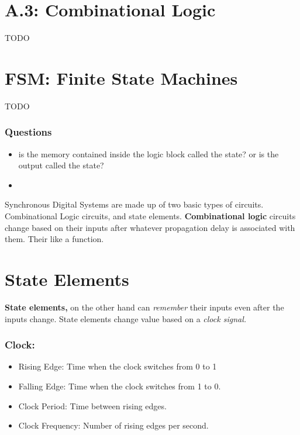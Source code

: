 \documentclass[12pt]{article}
\begin{document}
\section*{A.3: Combinational Logic}
 {\color{red} TODO}


\section*{FSM: Finite State Machines}
 {\color{red} TODO}

\subsubsection*{Questions}
\begin{itemize}
    \item is the memory contained inside the logic block called the state? or is the output called the state?
    \item
\end{itemize}

Synchronous Digital Systems are made up of two basic types of circuits. Combinational Logic circuits, and state elements. \textbf{Combinational logic} circuits change based on their inputs after whatever propagation delay is associated with them. Their like a function.

\section*{State Elements}
\textbf{State elements,} on the other hand can \emph{remember} their inputs even after the inputs change. State elements change value based on a \emph{clock signal.}
\subsubsection*{Clock:}
\begin{itemize}
    \item Rising Edge: Time when the clock switches from 0 to 1
    \item Falling Edge: Time when the clock switches from 1 to 0.
    \item Clock Period: Time between rising edges.
    \item Clock Frequency: Number of rising edges per second.
\end{itemize}
\end{document}
